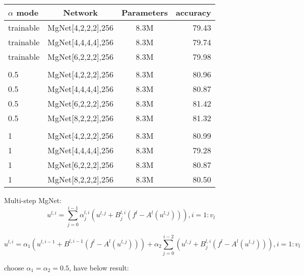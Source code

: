 \begin{tabular}{| l | c | c | r |}
	\hline
	$\alpha$ mode &     Network             &     Parameters   &       accuracy   \\
	\hline
	trainable     &    MgNet[4,2,2,2],256   &       8.3M       &        79.43   \\
	\hline
	trainable     &    MgNet[4,4,4,4],256   &       8.3M       &        79.74   \\
	\hline
	trainable     &    MgNet[6,2,2,2],256   &       8.3M       &        79.98 \\
	\hline
	&                         &                  &              \\
	\hline
	0.5           &    MgNet[4,2,2,2],256   &       8.3M       &        80.96 \\
	\hline
	0.5           &    MgNet[4,4,4,4],256   &       8.3M       &        80.87 \\
	\hline
	0.5           &    MgNet[6,2,2,2],256   &       8.3M       &        81.42 \\
	\hline
	0.5           &    MgNet[8,2,2,2],256   &       8.3M       &        81.32 \\
	\hline
	&                         &                  &              \\
	\hline
	1             &    MgNet[4,2,2,2],256   &       8.3M       &        80.99 \\
	\hline
	1             &    MgNet[4,4,4,4],256   &       8.3M       &        79.28 \\
	\hline
	1             &    MgNet[6,2,2,2],256   &       8.3M       &        80.87 \\
	\hline
	1             &    MgNet[8,2,2,2],256   &       8.3M       &        80.50 \\
	\hline
\end{tabular}

\vbox{}
Multi-step MgNet:\\
\begin{equation}
u^{l,i} = \sum _{j=0}^{i-1}\alpha _j^{l,i}(u^{l,j} + B_j^{l,i}(f^l-A^l(u^{l,j}))),i = 1:v_l
\end{equation}

\begin{equation}
u^{l,i} = \alpha_1(u^{l,i-1}+B^{l,i-1}(f^l-A^l(u^{l,j}))) + \alpha_2\sum _{j=0}^{i-2}(u^{l,j} + B_j^{l,i}(f^l-A^l(u^{l,j}))),i = 1:v_l
\end{equation}

\vbox{}
choose $\alpha_1=\alpha_2=0.5$, have below result:\\

